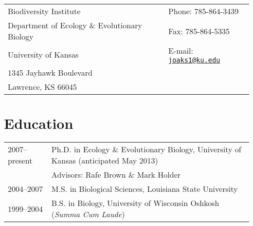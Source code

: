 \documentclass[10pt]{article}
\begin{document}
\raggedright
\singlespacing

\noindent\begin{tabular*}{\textwidth}[tb]{ @{}l @{\extracolsep{\fill}} l@{}}
Biodiversity Institute                                               & Phone: 785-864-3439 \\
Department of Ecology \& Evolutionary Biology     & Fax: 785-864-5335 \\
University of Kansas                                              & E-mail: \href{joaks1@gmail.com}{\tt joaks1@ku.edu} \\
1345 Jayhawk Boulevard                                       & \\
Lawrence, KS 66045                                              & \\
\end{tabular*}

\section*{Education}
\noindent\begin{tabulary}{\textwidth}{ @{} l L @{} }
2007--present	& Ph.D. in Ecology \& Evolutionary Biology, University of Kansas (anticipated May 2013) \\
			& \addtolength{\leftskip}{5mm}Advisors:  Rafe Brown \& Mark Holder \\[0.25em]
2004--2007	& M.S. in Biological Sciences, Louisiana State University \\[0.25em]
1999--2004	& B.S. in Biology, University of Wisconsin Oshkosh (\emph{Summa Cum Laude}) \\
\end{tabulary}
\end{document}

